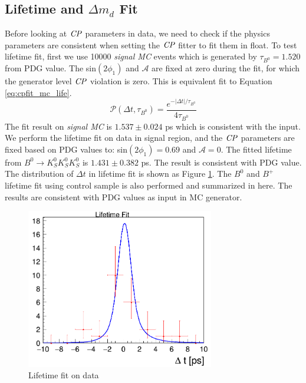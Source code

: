 \subsection{Lifetime and $\Delta m_d$ Fit}
Before looking at $\it{CP}$ parameters in data, we need to check if the physics parameters are consistent when setting the $\it{CP}$ fitter to fit them in float. To test lifetime fit, first we use 10000 \textit{signal MC} events which is generated by $\tau_{B^0} = 1.520$ from PDG value. The sin$(2\phi_1)$ and $\mathcal{A}$ are fixed at zero during the fit, for which the generator level $\it{CP}$ violation is zero. This is equivalent fit to Equation \ref{eq:cpfit_mc_life}.
\begin{equation}\label{eq:cpfit_mc_life}
\mathcal{P}(\Delta t,\tau_{B^0}) = 
\frac{e^{-|\Delta t|/\tau_{B^0}}}{4\tau_{B^0}}
\end{equation}
The fit result on \textit{signal MC} is $1.537 \pm 0.024$ ps which is consistent with the input. We perform the lifetime fit on data in signal region, and the $\it{CP}$ parameters are fixed based on PDG values to: sin$(2\phi_1)=0.69$ and $\mathcal{A} = 0$. The fitted lifetime from $B^0 \to K_S^0  K_S^0  K_S^0$ is $1.431\pm 0.382$ ps. The result is consistent with PDG value. The distribution of $\Delta t$ in lifetime fit is shown as Figure \ref{fig:cpfit_data_life}.
The $B^0$ and $B^+$ lifetime fit using control sample is also performed and summarized in here\cite{jpsiks_ichep}. The results are consistent with PDG values as input in MC generator. 
\begin{figure}[htpb]
	\centering
	\includegraphics[height=7cm]{figures/lifetime_data}
	\caption{Lifetime fit on data}
	\label{fig:cpfit_data_life}
\end{figure}

